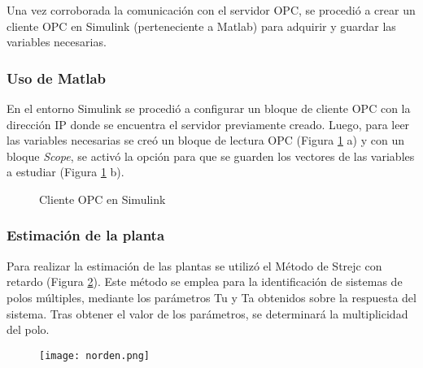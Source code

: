 {Una vez corroborada la comunicación con el servidor OPC, se procedió a crear un cliente OPC en Simulink (perteneciente a Matlab) para adquirir y guardar las variables necesarias. 


\subsubsection{Uso de Matlab}
En el entorno Simulink se procedió a configurar un bloque de cliente OPC con la dirección IP donde se encuentra el servidor previamente creado. Luego, para leer las variables necesarias se creó un bloque de lectura OPC (Figura \ref{fig:opcsimu} a) y con un bloque \textit{Scope}, se activó la opción para que se guarden los vectores de las variables a estudiar (Figura \ref{fig:opcsimu} b). 


\begin{figure}[htbp]
	\centering
	\caption{Cliente OPC en Simulink} \label{fig:opcsimu}
\end{figure}



\subsubsection{Estimación de la planta}
Para realizar la estimación de las plantas se utilizó el Método de Strejc con retardo (Figura \ref{fig:norden})\cite{pomares2011sistemas}.
Este método se emplea para la identificación de sistemas de polos múltiples,
mediante los parámetros Tu y Ta obtenidos sobre la respuesta del sistema.
Tras obtener el valor de los parámetros, se determinará la multiplicidad del polo. 
\begin{figure}[htb]
	\centering
	\texttt{[image: norden.png]}
	\label{fig:norden}
\end{figure}

}
